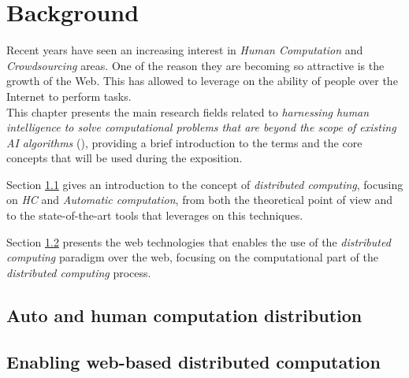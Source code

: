 \chapter{Background}
\label{cap:bg}


Recent years have seen an increasing interest in \emph{Human Computation}
and \emph{Crowdsourcing} areas. One of the reason they are becoming
so attractive is the growth of the Web. This has allowed to leverage
on the ability of people over the Internet to perform tasks.\\

This chapter presents the main research fields related to \emph{harnessing human
intelligence to solve computational problems that are beyond the scope of existing
\ac{AI} algorithms} (\cite{human:comp}), providing a brief introduction to the
terms and the core concepts that will be used during the exposition.

Section \ref{sec:bg:crowd} gives an introduction to the concept of \emph{distributed
computing}, focusing on \emph{\ac{HC}} and \emph{Automatic computation}, from
both the theoretical point of view and to the state-of-the-art tools that
leverages on this techniques.

Section \ref{sec:bg:web} presents the web technologies that enables the 
use of the \emph{distributed computing} paradigm over the web, focusing on the
computational part of the \emph{distributed computing} process.

\section{Auto and human computation distribution}
\label{sec:bg:crowd}




\section{Enabling web-based distributed computation}
\label{sec:bg:web}
